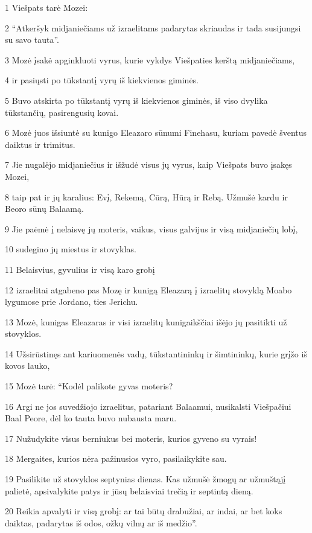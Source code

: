 \par 1 Viešpats tarė Mozei: 
\par 2 “Atkeršyk midjaniečiams už izraelitams padarytas skriaudas ir tada susijungsi su savo tauta”. 
\par 3 Mozė įsakė apginkluoti vyrus, kurie vykdys Viešpaties kerštą midjaniečiams, 
\par 4 ir pasiųsti po tūkstantį vyrų iš kiekvienos giminės. 
\par 5 Buvo atskirta po tūkstantį vyrų iš kiekvienos giminės, iš viso dvylika tūkstančių, pasirengusių kovai. 
\par 6 Mozė juos išsiuntė su kunigo Eleazaro sūnumi Finehasu, kuriam pavedė šventus daiktus ir trimitus. 
\par 7 Jie nugalėjo midjaniečius ir išžudė visus jų vyrus, kaip Viešpats buvo įsakęs Mozei, 
\par 8 taip pat ir jų karalius: Evį, Rekemą, Cūrą, Hūrą ir Rebą. Užmušė kardu ir Beoro sūnų Balaamą. 
\par 9 Jie paėmė į nelaisvę jų moteris, vaikus, visus galvijus ir visą midjaniečių lobį, 
\par 10 sudegino jų miestus ir stovyklas. 
\par 11 Belaisvius, gyvulius ir visą karo grobį 
\par 12 izraelitai atgabeno pas Mozę ir kunigą Eleazarą į izraelitų stovyklą Moabo lygumose prie Jordano, ties Jerichu. 
\par 13 Mozė, kunigas Eleazaras ir visi izraelitų kunigaikščiai išėjo jų pasitikti už stovyklos. 
\par 14 Užsirūstinęs ant kariuomenės vadų, tūkstantininkų ir šimtininkų, kurie grįžo iš kovos lauko, 
\par 15 Mozė tarė: “Kodėl palikote gyvas moteris? 
\par 16 Argi ne jos suvedžiojo izraelitus, patariant Balaamui, nusikalsti Viešpačiui Baal Peore, dėl ko tauta buvo nubausta maru. 
\par 17 Nužudykite visus berniukus bei moteris, kurios gyveno su vyrais! 
\par 18 Mergaites, kurios nėra pažinusios vyro, pasilaikykite sau. 
\par 19 Pasilikite už stovyklos septynias dienas. Kas užmušė žmogų ar užmuštąjį palietė, apsivalykite patys ir jūsų belaisviai trečią ir septintą dieną. 
\par 20 Reikia apvalyti ir visą grobį: ar tai būtų drabužiai, ar indai, ar bet koks daiktas, padarytas iš odos, ožkų vilnų ar iš medžio”. 

